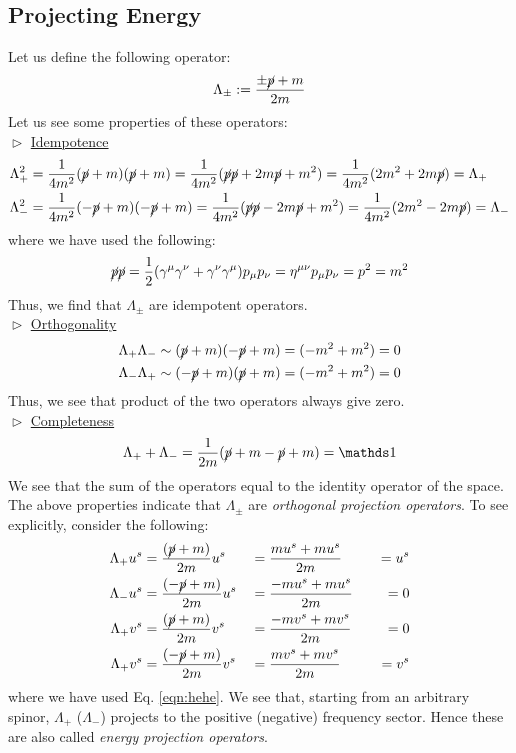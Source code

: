 \subsection{Projecting Energy}
Let us define the following operator:
$$\Lambda_{\pm} := \frac{\pm \cancel{p} +m}{2m}$$
Let us see some properties of these operators:\\[0.2cm]
$\vartriangleright$ \underline{Idempotence}
\begin{align*}
    \Lambda_+^2 &= \frac{1}{4m^2} (\cancel{p}+m)(\cancel{p}+m) = \frac{1}{4m^2}(\cancel{p}\cancel{p}+2m\cancel{p} + m^2)  = \frac{1}{4m^2}(2m^2+2m\cancel{p}) = \Lambda_+\\
 \Lambda_-^2 &= \frac{1}{4m^2} (-\cancel{p}+m)(-\cancel{p}+m) = \frac{1}{4m^2}(\cancel{p}\cancel{p}-2m\cancel{p} + m^2)  = \frac{1}{4m^2}(2m^2-2m\cancel{p}) = \Lambda_-
\end{align*}
where we have used the following:
\begin{align*}
    \cancel{p}\cancel{p} = \frac{1}{2}\qty(\gamma^\mu \gamma^\nu + \gamma^\nu \gamma^\mu) p_\mu p_\nu = \eta^{\mu\nu}p_\mu p_\nu = p^2 =m^2
\end{align*}
Thus, we find that $\Lambda_{\pm}$ are idempotent operators.\\[0.2cm] 
$\vartriangleright$ \underline{Orthogonality}
\begin{align*}
    \Lambda_{+} \Lambda_{-} &\sim (\cancel{p}+m)(-\cancel{p}+m) = (-m^2 +m^2) =0\\
    \Lambda_{-} \Lambda_{+} &\sim (-\cancel{p}+m)(\cancel{p}+m) = (-m^2 +m^2) =0
\end{align*}
Thus, we see that product of the two operators always give zero. \\[0.2cm]
$\vartriangleright$ \underline{Completeness}
\begin{align*}
    \Lambda_+ + \Lambda_- = \frac{1}{2m}\qty(\gsl{p}+{m} -\gsl{p} +{m}) = \iden
\end{align*}
We see that the sum of the operators equal to the identity operator of the space. \\[0.2cm]
The above properties indicate that $\Lambda_{\pm}$ are \textit{orthogonal projection operators}. To see explicitly, consider the following:
\begin{alignat*}{4}
    \Lambda_+ u^s &= \frac{(\cancel{p}+m)}{2m}u^s &&= \frac{m u^s + m u^s}{2m} &&&= u^s\\
    \Lambda_- u^s &= \frac{(-\cancel{p}+m)}{2m}u^s &&= \frac{-m u^s + m u^s}{2m} &&&= 0\\
    \Lambda_+ v^s &= \frac{(\cancel{p}+m)}{2m}v^s &&= \frac{-m v^s + m v^s}{2m} &&&= 0\\
    \Lambda_+ v^s &= \frac{(-\cancel{p}+m)}{2m}v^s &&= \frac{m v^s + m v^s}{2m} &&&= v^s
\end{alignat*}
where we have used Eq. \ref{eqn:hehe}. We see that, starting from an arbitrary spinor, $\Lambda_{+}$ ($\Lambda_{-}$) projects to the positive (negative) frequency sector. Hence these are also called \textit{energy projection operators}. 